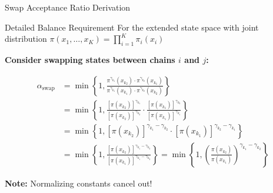\documentclass[aspectratio=169]{beamer}
\begin{document}
\begin{frame}{Swap Acceptance Ratio Derivation}
	\begin{block}{Detailed Balance Requirement}
		For the extended state space with joint distribution $\pi(x_1, \ldots, x_K) = \prod_{i=1}^K \pi_i(x_i)$
	\end{block}

	\textbf{Consider swapping states between chains $i$ and $j$:}

	\begin{align*}
		\alpha_{\text{swap}} & = \min\left\{1, \frac{\pi^{\gamma_{k_1}}(x_{k_2}) \cdot \pi^{\gamma_{k_2}}(x_{k_1})}{\pi^{\gamma_{k_1}}(x_{k_1}) \cdot \pi^{\gamma_{k_2}}(x_{k_2})}\right\}           \\
		                     & = \min\left\{1, \frac{[\pi(x_{k_2})]^{\gamma_{k_1}}}{[\pi(x_{k_2})]^{\gamma_{k_2}}} \cdot \frac{[\pi(x_{k_1})]^{\gamma_{k_2}}}{[\pi(x_{k_1})]^{\gamma_{k_1}}}\right\} \\
		                     & = \min\left\{1, [\pi(x_{k_2})]^{\gamma_{k_1} - \gamma_{k_2}} \cdot [\pi(x_{k_1})]^{\gamma_{k_2} - \gamma_{k_1}}\right\}                                               \\
		                     & = \min\left\{1, \frac{[\pi(x_{k_2})]^{\gamma_{k_1} - \gamma_{k_2}}}{[\pi(x_{k_1})]^{\gamma_{k_1} - \gamma_{k_2}}}\right\}
		= \min\left\{1, \left(\frac{\pi(x_{k_2})}{\pi(x_{k_1})}\right) ^{\gamma_{k_1} - \gamma_{k_2}}    \right\}
	\end{align*}



	\textcolor{copenhagenred}{\textbf{Note:}} Normalizing constants cancel out!
\end{frame}
\end{document}
